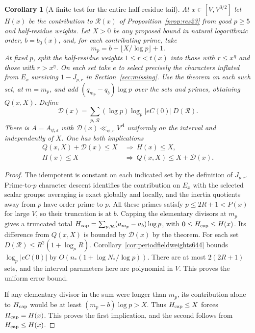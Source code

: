 \documentclass[a4paper,11pt]{article}
\newtheorem{corollary}[proposition]{Corollary}
\theoremstyle{definition}
\theoremstyle{remark}
\numberwithin{equation}{section}
\begin{document}
\begin{corollary}[A finite test for the entire half-residue tail]
\leavevmode\label{cor:halftail647}
At \(x\in[V,V^{3/2}]\) let \(H(x)\) be the contribution to
\(\mathcal R(x)\) of Proposition~\ref{prop:res23} from good
\(p\ge5\) and half-residue weights. Let \(X>0\) be any
proposed bound in natural logarithmic order, \(b=b_0(x)\),
and, for each contributing prime, take
\[
              m_p=b+\lfloor X/\log p\rfloor+1 .
\]
At fixed \(p\), split the half-residue weights \(1\le r<t(x)\)
into those with \(r\le x^\eta\) and those with \(r>x^\eta\).
On each set take \(e\) to select precisely the characters
inflated from \(E_x\) surviving \(1-J_{p,r}\) in
Section~\ref{sec:missing}. Use the theorem on each such set,
at \(m=m_p\), and add \((q_{m_p}-q_b)\log p\) over the sets
and primes, obtaining \(Q(x,X)\). Define
\[
 \mathcal D(x)=\sum_{p,\,\mathcal R}
       (\log p)\log_p|eC(0)|\,D(\mathcal R).
\]
There is \(A=A_{\psi,\varepsilon}\) with
\(\mathcal D(x)\ll_{\psi,\varepsilon}V^A\) uniformly on
the interval and independently of \(X\). One has both
implications
\[
 \begin{split}
    Q(x,X)+\mathcal D(x)\le X &\ \Longrightarrow\ H(x)\le X,\\
    H(x)\le X &\ \Longrightarrow\ Q(x,X)\le X+\mathcal D(x).
 \end{split}
\]
\end{corollary}
\begin{proof}
The idempotent is constant on each indicated set by the
definition of \(J_{p,r}\). Prime-to-\(p\) character descent
identifies the contribution on \(E_x\) with the selected
scalar groups: averaging is exact globally and locally, and
the inertia quotients away from \(p\) have order prime to
\(p\). All these primes satisfy \(p\le2R+1<P(x)\) for large
\(V\), so their truncation is at \(b\). Capping the
elementary divisors at \(m_p\) gives a truncated total
\(H_{\rm cap}=\sum_{p,\mathcal R}(a_{m_p}-a_b)\log p\),
with \(0\le H_{\rm cap}\le H(x)\). Its difference from
\(Q(x,X)\) is bounded by \(\mathcal D(x)\) by the theorem.
For each set \(D(\mathcal R)\le R^2(1+\log_p R)\).
Corollary~\ref{cor:periodfieldweights644} bounds
\(\log_p|eC(0)|\) by \(O(n_*(1+\log N_*/\log p))\).
There are at most \(2(2R+1)\) sets, and the interval
parameters here are polynomial in \(V\). This proves the
uniform error bound.

If any elementary divisor in the sum were longer than
\(m_p\), its contribution alone to \(H_{\rm cap}\) would
be at least \((m_p-b)\log p>X\). Thus \(H_{\rm cap}\le X\)
forces \(H_{\rm cap}=H(x)\). This proves the first
implication, and the second follows from \(H_{\rm cap}\le H(x)\).
\end{proof}
\end{document}
